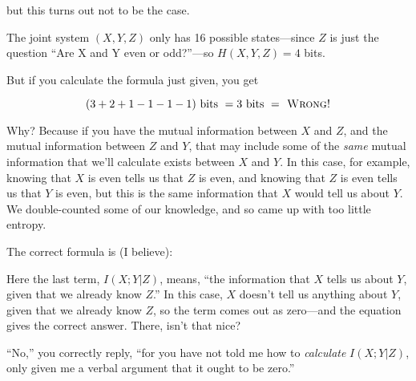 {{

{
 but this turns out not to be the case. }

{
 The joint system $(X,Y,Z)$ only has 16 possible states---since $Z$ is
just the question ``Are X and Y even or
odd?''---so $H(X,Y,Z) = 4$ bits.}

{
 But if you calculate the formula just given, you get}

\begin{equation*}
 (3 + 2 + 1 - 1 - 1 - 1) \text{ bits }= 3\text{ bits }=\textsc{ Wrong!}
\end{equation*}



{
 Why? Because if you have the mutual information between $X$ and $Z$,
and the mutual information between $Z$ and $Y$, that may include some of
the \textit{same} mutual information that we'll
calculate exists between $X$ and $Y$. In this case, for example, knowing
that $X$ is even tells us that $Z$ is even, and knowing that $Z$ is even
tells us that $Y$ is even, but this is the same information that $X$ would
tell us about $Y$. We double-counted some of our knowledge, and so came
up with too little entropy. }

{
 The correct formula is (I believe):}



{
 Here the last term, $I(X;Y |Z)$, means,
``the information that $X$ tells us about $Y$, given that
we already know $Z$.'' In this case, $X$
doesn't tell us anything about $Y$, given that we already
know $Z$, so the term comes out as zero---and the equation gives the
correct answer. There, isn't that nice? }

{
 ``No,'' you correctly reply,
``for you have not told me how to \textit{calculate}
$I(X;Y|Z)$, only given me a verbal argument that it ought to be
zero.''}

}}
